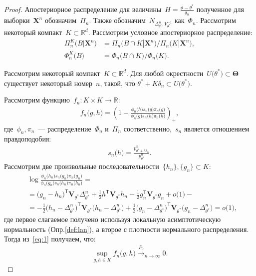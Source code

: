 \documentclass[../main.tex]{subfiles}
\begin{document}
\begin{proof}
Апостериорное распределение для величины~$H=\frac{\vartheta-\theta^*}{\delta_n}$ полученное для выборки~$\textbf{X}^{n}$ обозначим~$\Pi_n$. Также обозначим~$N_{\Delta^n_{\theta^*}, V_{\theta^*}^{-1}}$ как~$\Phi_n$.
Рассмотрим некоторый компакт~$K \subset \mathbb{R}^{d}$. Рассмотрим условное апостериорное распределение:
\[
\begin{aligned}
\Pi_n^K\bigr(B|\textbf{X}^n\bigr) &= \Pi_n\bigr(B \cap K | \textbf{X}^n\bigr)/\Pi_n\bigr(K|\textbf{X}^n\bigr),\\
\Phi_n^K\bigr(B\bigr) &= \Phi_n\bigr(B \cap K\bigr)/\Phi_n\bigr(K\bigr).
\end{aligned}
\]

Рассмотрим некоторый компакт~$K \subset \mathbb{R}^{d}$. Для любой окрестности~$U\bigr(\theta^*\bigr) \subset \bm{\Theta}$ существует некоторый номер~$n$, такой, что $\theta^*+K\delta_n\subset U\bigr(\theta^*\bigr)$.

Рассмотрим функцию~$f_n:K\times K \to \mathbb{R}:$
\[
\begin{aligned}
f_n\bigr(g, h\bigr) = \left(1-\frac{\phi_n\bigr(h\bigr)s_n\bigr(g\bigr)\pi_n\bigr(g\bigr)}{\phi_n\bigr(g\bigr)s_n\bigr(h\bigr)\pi_n\bigr(h\bigr)}\right)_+,
\end{aligned}
\]
где~$\phi_n, \pi_n$~--- распределение~$\Phi_n$ и~$\Pi_n$ соответственно,~$s_n$ является отношением правдоподобия:
\[
\begin{aligned}
s_n\bigr(h\bigr) = \frac{p^n_{\theta^*+h\delta_n}}{p^n_{\theta^*}}.
\end{aligned}
\]
Рассмотрим две произвольные последовательности~$\{h_n\}, \{g_n\} \subset K$:
\[
\label{eq:1}
\begin{aligned}
&\log\frac{\phi_n\bigr(h_n\bigr)s_n\bigr(g_n\bigr)\pi_n\bigr(g_n\bigr)}{\phi_n\bigr(g_n\bigr)s_n\bigr(h_n\bigr)\pi_n\bigr(h_n\bigr)} =\\
&= \bigr(g_n-h_n\bigr)^{\mathsf{T}}\textbf{V}_{\theta^*}\Delta^n_{\theta^*}+\frac{1}{2}h^{\mathsf{T}}\textbf{V}_{\theta^*}h_n-\frac{1}{2}g_n^{\mathsf{T}}\textbf{V}_{\theta^*}g_n + o\bigr(1\bigr) -\\
&= -\frac{1}{2}\bigr(h_n-\Delta^{n}_{\theta^*}\bigr)^{\mathsf{T}}\textbf{V}_{\theta^*}\bigr(h_n-\Delta^{n}_{\theta^*}\bigr) + \frac{1}{2}\bigr(g_n-\Delta^{n}_{\theta^*}\bigr)^{\mathsf{T}}\textbf{V}_{\theta^*}\bigr(g_n-\Delta^{n}_{\theta^*}\bigr) = o\bigr(1\bigr),
\end{aligned}
\]
где первое слагаемое получено используя локальную асимптотическую нормальность (Опр.\ref{def:lan}), а второе с плотности нормального распределения. Тогда из~\eqref{eq:1} получаем, что:
\[
\label{eq:2}
\begin{aligned}
\sup_{g,h\in K}f_n\bigr(g, h\bigr) \overset{P_0}{\to}_{n \to \infty} 0.
\end{aligned}
\]


\end{proof}
\end{document}
